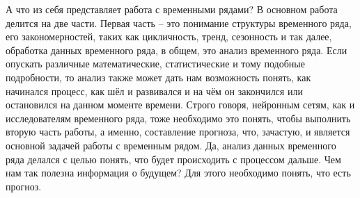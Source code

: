 {\par А что из себя представляет работа с временными рядами? В основном работа делится на две части. Первая часть – это понимание структуры временного ряда, его закономерностей, таких как цикличность, тренд, сезонность и так далее, обработка данных временного ряда, в общем, это анализ временного ряда. Если опускать различные математические, статистические и тому подобные подробности, то анализ также может дать нам возможность понять, как начинался процесс, как шёл и развивался и на чём он закончился или остановился на данном моменте времени.  Строго говоря, нейронным сетям, как и исследователям временного ряда, тоже необходимо это понять, чтобы выполнить вторую часть работы, а именно, составление прогноза, что, зачастую, и является основной задачей работы с временным рядом. Да, анализ данных временного ряда делался с целью понять, что будет происходить с процессом дальше. Чем нам так полезна информация о будущем? Для этого необходимо понять, что есть прогноз. 

\par
}